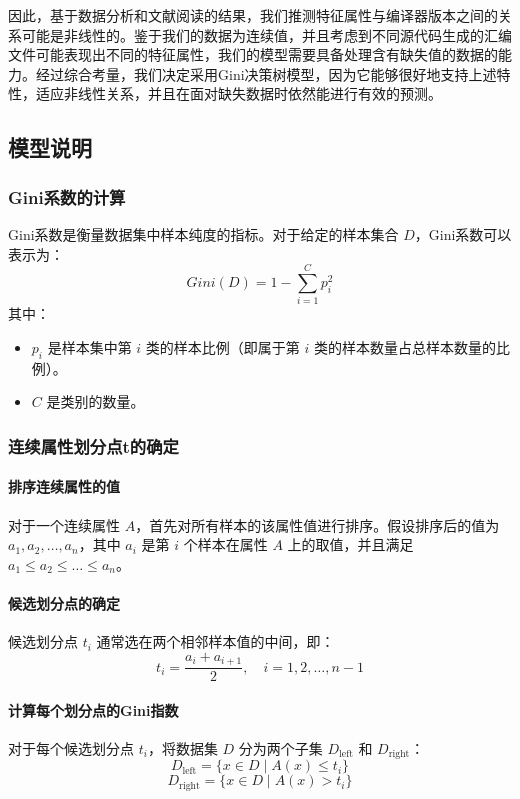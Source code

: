 因此，基于数据分析和文献阅读的结果，我们推测特征属性与编译器版本之间的关系可能是非线性的。鉴于我们的数据为连续值，并且考虑到不同源代码生成的汇编文件可能表现出不同的特征属性，我们的模型需要具备处理含有缺失值的数据的能力。经过综合考量，我们决定采用Gini决策树模型，因为它能够很好地支持上述特性，适应非线性关系，并且在面对缺失数据时依然能进行有效的预测。
    \subsection{模型说明}
    \subsubsection{Gini系数的计算}
Gini系数是衡量数据集中样本纯度的指标。对于给定的样本集合 \(D\)，Gini系数可以表示为：
\begin{equation}
Gini(D) = 1 - \sum_{i=1}^{C} p_i^2
\end{equation}
其中：
\begin{itemize}
  \item \(p_i\) 是样本集中第 \(i\) 类的样本比例（即属于第 \(i\) 类的样本数量占总样本数量的比例）。
  \item \(C\) 是类别的数量。
\end{itemize}





\subsubsection{连续属性划分点t的确定}

\paragraph{排序连续属性的值}
对于一个连续属性 \(A\)，首先对所有样本的该属性值进行排序。假设排序后的值为 \(a_1, a_2, \dots, a_n\)，其中 \(a_i\) 是第 \(i\) 个样本在属性 \(A\) 上的取值，并且满足 \(a_1 \leq a_2 \leq \dots \leq a_n\)。

\paragraph{候选划分点的确定}
候选划分点 \(t_i\) 通常选在两个相邻样本值的中间，即：
\begin{equation}
t_i = \frac{a_i + a_{i+1}}{2}, \quad i = 1, 2, \dots, n-1
\end{equation}

\paragraph{计算每个划分点的Gini指数}
对于每个候选划分点 \(t_i\)，将数据集 \(D\) 分为两个子集 \(D_{\text{left}}\) 和 \(D_{\text{right}}\)：
\begin{equation}
D_{\text{left}} = \{x \in D \mid A(x) \leq t_i\}
\end{equation}
\begin{equation}
D_{\text{right}} = \{x \in D \mid A(x) > t_i\}
\end{equation}

